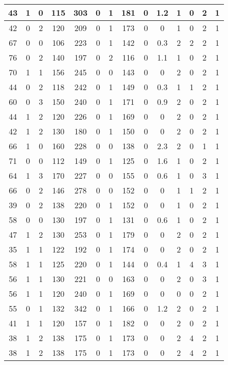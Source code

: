 \documentclass{article}
\begin{document}
\begin{longtable}{|c|c|c|c|c|c|c|c|c|c|c|c|c|c|}
\hline
43 & 1 & 0 & 115 & 303 & 0 & 1 & 181 & 0 & 1.2 & 1 & 0 & 2 & 1\\
\hline
42 & 0 & 2 & 120 & 209 & 0 & 1 & 173 & 0 & 0 & 1 & 0 & 2 & 1\\
\hline
67 & 0 & 0 & 106 & 223 & 0 & 1 & 142 & 0 & 0.3 & 2 & 2 & 2 & 1\\
\hline
76 & 0 & 2 & 140 & 197 & 0 & 2 & 116 & 0 & 1.1 & 1 & 0 & 2 & 1\\
\hline
70 & 1 & 1 & 156 & 245 & 0 & 0 & 143 & 0 & 0 & 2 & 0 & 2 & 1\\
\hline
44 & 0 & 2 & 118 & 242 & 0 & 1 & 149 & 0 & 0.3 & 1 & 1 & 2 & 1\\
\hline
60 & 0 & 3 & 150 & 240 & 0 & 1 & 171 & 0 & 0.9 & 2 & 0 & 2 & 1\\
\hline
44 & 1 & 2 & 120 & 226 & 0 & 1 & 169 & 0 & 0 & 2 & 0 & 2 & 1\\
\hline
42 & 1 & 2 & 130 & 180 & 0 & 1 & 150 & 0 & 0 & 2 & 0 & 2 & 1\\
\hline
66 & 1 & 0 & 160 & 228 & 0 & 0 & 138 & 0 & 2.3 & 2 & 0 & 1 & 1\\
\hline
71 & 0 & 0 & 112 & 149 & 0 & 1 & 125 & 0 & 1.6 & 1 & 0 & 2 & 1\\
\hline
64 & 1 & 3 & 170 & 227 & 0 & 0 & 155 & 0 & 0.6 & 1 & 0 & 3 & 1\\
\hline
66 & 0 & 2 & 146 & 278 & 0 & 0 & 152 & 0 & 0 & 1 & 1 & 2 & 1\\
\hline
39 & 0 & 2 & 138 & 220 & 0 & 1 & 152 & 0 & 0 & 1 & 0 & 2 & 1\\
\hline
58 & 0 & 0 & 130 & 197 & 0 & 1 & 131 & 0 & 0.6 & 1 & 0 & 2 & 1\\
\hline
47 & 1 & 2 & 130 & 253 & 0 & 1 & 179 & 0 & 0 & 2 & 0 & 2 & 1\\
\hline
35 & 1 & 1 & 122 & 192 & 0 & 1 & 174 & 0 & 0 & 2 & 0 & 2 & 1\\
\hline
58 & 1 & 1 & 125 & 220 & 0 & 1 & 144 & 0 & 0.4 & 1 & 4 & 3 & 1\\
\hline
56 & 1 & 1 & 130 & 221 & 0 & 0 & 163 & 0 & 0 & 2 & 0 & 3 & 1\\
\hline
56 & 1 & 1 & 120 & 240 & 0 & 1 & 169 & 0 & 0 & 0 & 0 & 2 & 1\\
\hline
55 & 0 & 1 & 132 & 342 & 0 & 1 & 166 & 0 & 1.2 & 2 & 0 & 2 & 1\\
\hline
41 & 1 & 1 & 120 & 157 & 0 & 1 & 182 & 0 & 0 & 2 & 0 & 2 & 1\\
\hline
38 & 1 & 2 & 138 & 175 & 0 & 1 & 173 & 0 & 0 & 2 & 4 & 2 & 1\\
\hline
38 & 1 & 2 & 138 & 175 & 0 & 1 & 173 & 0 & 0 & 2 & 4 & 2 & 1\\

\end{longtable}
\end{document}
